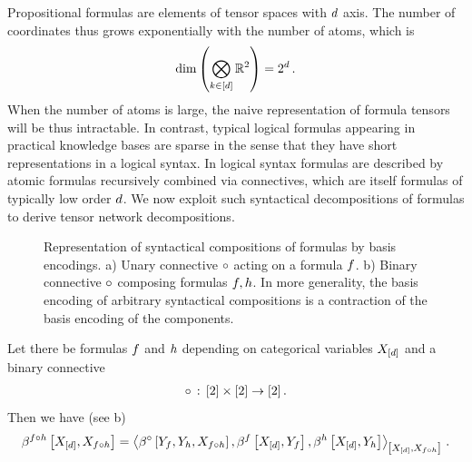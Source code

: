 Propositional formulas are elements of tensor spaces with $d$ axis.
The number of coordinates thus grows exponentially with the number of atoms, which is
\begin{align*}
    \mathrm{dim}\left(\bigotimes_{k\in[d]}\mathbb{R}^2\right) = 2^{d} \, .
\end{align*}
When the number of atoms is large, the naive representation of formula tensors will be thus intractable.
In contrast, typical logical formulas appearing in practical knowledge bases are sparse in the sense that they have short representations in a logical syntax.
In logical syntax formulas are described by atomic formulas recursively combined via connectives, which are itself formulas of typically low order $d$.
We now exploit such syntactical decompositions of formulas to derive tensor network decompositions.

\begin{figure}[t]
    \begin{center}
        
    \end{center}
    \caption{Representation of syntactical compositions of formulas by basis encodings.
    a) Unary connective $\circ$ acting on a formula $f$.
    b) Binary connective $\circ$ composing formulas $f, h$. %
    In more generality, the basis encoding of arbitrary syntactical compositions is a contraction of the basis encoding of the components.
    }
    \label{fig:unaryBinaryComposition}
\end{figure}

Let there be formulas $f$ and $h$ depending on categorical variables $X_{[d]}$ and a binary connective
\begin{align*}
    \circ \,:\, [2]\times[2] \rightarrow[2] \, .
\end{align*}
Then we have (see b)
\begin{align*}
    \bencodingofat{\exformula\exconnective\secexformula}{\shortcatvariables,\catvariableof{\exformula\exconnective\secexformula}}
    = \contractionof{
        \bencodingofat{\exconnective}{\formulavar,\secexformulavar,\catvariableof{\exformula\exconnective\secexformula}},
        \bencodingofat{\exformula}{\shortcatvariables,\formulavar},
        \bencodingofat{\secexformula}{\shortcatvariables,\secexformulavar}
    }{
        \shortcatvariables,\catvariableof{\exformula\exconnective\secexformula}
    } \, .
\end{align*}


